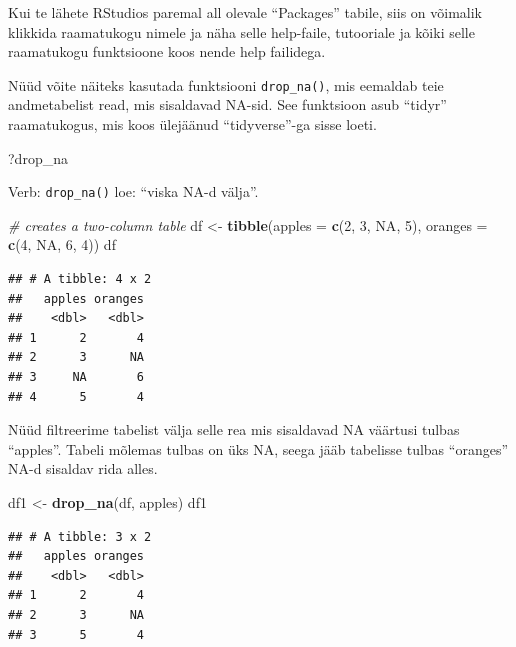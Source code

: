 \documentclass[]{book}
\newenvironment{Shaded}{\begin{snugshade}}{\end{snugshade}}
\newcommand{\KeywordTok}[1]{\textcolor[rgb]{0.13,0.29,0.53}{\textbf{#1}}}
\newcommand{\DataTypeTok}[1]{\textcolor[rgb]{0.13,0.29,0.53}{#1}}
\newcommand{\DecValTok}[1]{\textcolor[rgb]{0.00,0.00,0.81}{#1}}
\newcommand{\StringTok}[1]{\textcolor[rgb]{0.31,0.60,0.02}{#1}}
\newcommand{\CommentTok}[1]{\textcolor[rgb]{0.56,0.35,0.01}{\textit{#1}}}
\newcommand{\OtherTok}[1]{\textcolor[rgb]{0.56,0.35,0.01}{#1}}
\newcommand{\NormalTok}[1]{#1}
\begin{document}
Kui te lähete RStudios paremal all olevale ``Packages'' tabile, siis on
võimalik klikkida raamatukogu nimele ja näha selle help-faile,
tutooriale ja kõiki selle raamatukogu funktsioone koos nende help
failidega.

Nüüd võite näiteks kasutada funktsiooni \texttt{drop\_na()}, mis
eemaldab teie andmetabelist read, mis sisaldavad NA-sid. See funktsioon
asub ``tidyr'' raamatukogus, mis koos ülejäänud ``tidyverse''-ga sisse
loeti.

\begin{Shaded}
\begin{Highlighting}[]
\NormalTok{?drop_na}
\end{Highlighting}
\end{Shaded}

Verb: \texttt{drop\_na()} loe: ``viska NA-d välja''.

\begin{Shaded}
\begin{Highlighting}[]
\CommentTok{# creates a two-column table}
\NormalTok{df <-}\StringTok{ }\KeywordTok{tibble}\NormalTok{(}\DataTypeTok{apples =} \KeywordTok{c}\NormalTok{(}\DecValTok{2}\NormalTok{, }\DecValTok{3}\NormalTok{, }\OtherTok{NA}\NormalTok{, }\DecValTok{5}\NormalTok{), }\DataTypeTok{oranges =} \KeywordTok{c}\NormalTok{(}\DecValTok{4}\NormalTok{, }\OtherTok{NA}\NormalTok{, }\DecValTok{6}\NormalTok{, }\DecValTok{4}\NormalTok{)) }
\NormalTok{df}
\end{Highlighting}
\end{Shaded}

\begin{verbatim}
## # A tibble: 4 x 2
##   apples oranges
##    <dbl>   <dbl>
## 1      2       4
## 2      3      NA
## 3     NA       6
## 4      5       4
\end{verbatim}

Nüüd filtreerime tabelist välja selle rea mis sisaldavad NA väärtusi
tulbas ``apples''. Tabeli mõlemas tulbas on üks NA, seega jääb tabelisse
tulbas ``oranges'' NA-d sisaldav rida alles.

\begin{Shaded}
\begin{Highlighting}[]
\NormalTok{df1 <-}\StringTok{ }\KeywordTok{drop_na}\NormalTok{(df, apples) }
\NormalTok{df1}
\end{Highlighting}
\end{Shaded}

\begin{verbatim}
## # A tibble: 3 x 2
##   apples oranges
##    <dbl>   <dbl>
## 1      2       4
## 2      3      NA
## 3      5       4
\end{verbatim}
\end{document}
